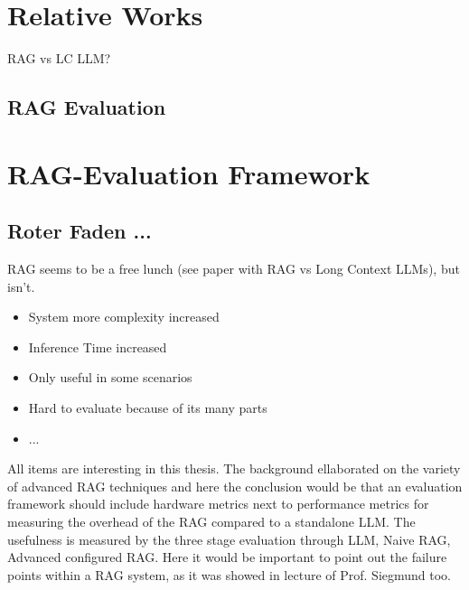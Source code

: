 \documentclass[english,master]{swsLeipzig}
\begin{document}
\chapter{Relative Works}
RAG vs LC LLM?
\section{RAG Evaluation}

\chapter{RAG-Evaluation Framework}

\section{Roter Faden ...}
RAG seems to be a free lunch (see paper with RAG vs Long Context LLMs), but isn't. 
\begin{itemize}
  \item System more complexity increased
  \item Inference Time increased
  \item Only useful in some scenarios 
  \item Hard to evaluate because of its many parts
  \item ...
\end{itemize}

All items are interesting in this thesis. The background ellaborated on the variety of advanced RAG techniques and here the conclusion would be that an evaluation framework should include hardware metrics next to performance metrics for measuring the overhead of the RAG compared to a standalone LLM. The usefulness is measured by the three stage evaluation through LLM, Naive RAG, Advanced configured RAG. Here it would be important to point out the failure points within a RAG system, as it was showed in lecture of Prof. Siegmund too. 

\end{document}
